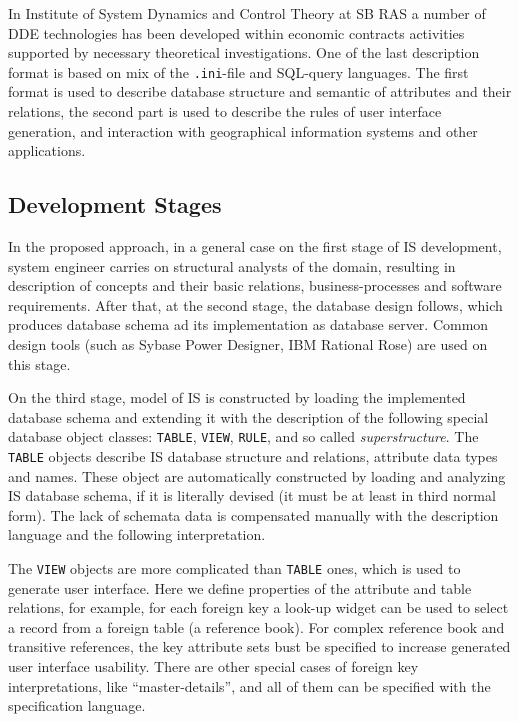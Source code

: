 \documentclass[conference]{IEEEtran}
\begin{document}
In Institute of System Dynamics and Control Theory at SB RAS a number of DDE technologies has been developed within economic contracts activities supported by necessary theoretical investigations.  One of the last description format is based on mix of the \texttt{.ini}-file and SQL-query languages.  The first format is used to describe database structure and semantic of attributes and their relations, the second part is used to describe the rules of user interface generation, and interaction with geographical information systems and other applications.

\subsection{Development Stages}
\label{sec:descr-synth-stag}

In the proposed approach, in a general case on the first stage of IS development, system engineer carries on structural analysts of the domain, resulting in description of concepts and their basic relations, business-processes and software requirements.  After that, at the second stage, the database design follows, which produces database schema ad its implementation as database server.  Common design tools (such as Sybase Power Designer, IBM Rational Rose) are used on this stage.

On the third stage, model of IS is constructed by loading the implemented database schema and extending it with the description of the following special database object classes: \texttt{TABLE}, \texttt{VIEW}, \texttt{RULE}, and so called \emph{superstructure}.  The \texttt{TABLE} objects describe IS database structure and relations, attribute data types and names.  These object are automatically constructed by loading and analyzing IS database schema, if it is literally devised (it must be at least in third normal form).  The lack of schemata data is compensated manually with the description language and the following interpretation.

The \texttt{VIEW} objects are more complicated than \texttt{TABLE} ones, which is used to generate user interface.  Here we define properties of the attribute and table relations, for example, for each foreign key a look-up widget can be used to select a record from a foreign table (a reference book).  For complex reference book and transitive references, the key attribute sets bust be specified to increase generated user interface usability.  There are other special cases of foreign key interpretations, like ``master-details'', and all of them can be specified with the specification language.
\end{document}
